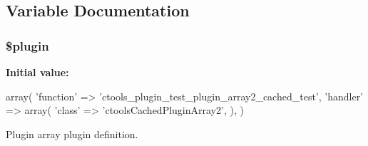 \subsection{Variable Documentation}
\hypertarget{cached_2plugin__array2_8inc_ada8a7130088351710bb02ed622d6bf65}{
\subsubsection[{\$plugin}]{\setlength{\rightskip}{0pt plus 5cm}\$plugin}}
\label{cached_2plugin__array2_8inc_ada8a7130088351710bb02ed622d6bf65}
{\bfseries Initial value:}
\begin{DoxyCode}
 array(
  'function' => 'ctools_plugin_test_plugin_array2_cached_test',
  'handler' => array(
    'class' => 'ctoolsCachedPluginArray2',
  ),
)
\end{DoxyCode}
Plugin array plugin definition. 